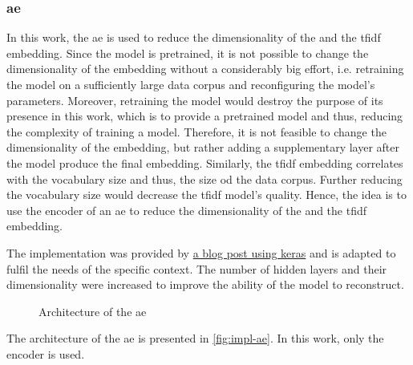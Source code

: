 \subsubsection*{\acl{ae}}\label{subsubsec:impl-autoencoder}

In this work, the \ac{ae} is used to reduce the dimensionality of the \infersent{} and the \ac{tfidf} embedding.
Since the \infersent{} model is pretrained, it is not possible to change the dimensionality of the embedding without a considerably big effort,
i.e. retraining the model on a sufficiently large data corpus and reconfiguring the model's parameters.
Moreover, retraining the model would destroy the purpose of its presence in this work, which is to provide a pretrained model and thus, 
reducing the complexity of training a model.
Therefore, it is not feasible to change the dimensionality of the \infersent{} embedding, but rather adding a supplementary layer after the model 
produce the final embedding.
Similarly, the \ac{tfidf} embedding correlates with the vocabulary size and thus, the size od the data corpus.
Further reducing the vocabulary size would decrease the \ac{tfidf} model's quality.
Hence, the idea is to use the encoder of an \ac{ae} to reduce the dimensionality of the \infersent{} and the \ac{tfidf} embedding.

The implementation was provided by 
\href{https://blog.paperspace.com/autoencoder-image-compression-keras/}{a blog post using keras}
and is adapted to fulfil the needs of the specific context.
The number of hidden layers and their dimensionality were increased to improve the ability of the model to reconstruct.

%     

\begin{figure}[h] %
    \centering
    
    \caption{Architecture of the \ac{ae}}
    \label{fig:impl-ae}
\end{figure}

The architecture of the \ac{ae} is presented in \autoref{fig:impl-ae}.
In this work, only the encoder is used.